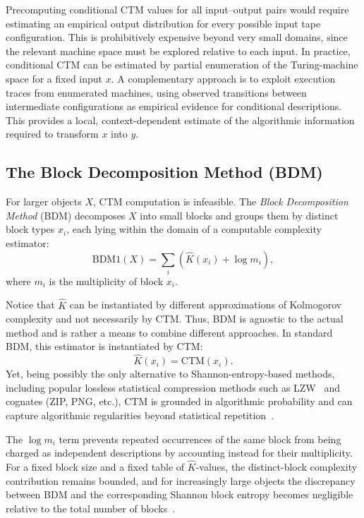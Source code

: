 \documentclass{article}
\begin{document}
Precomputing conditional CTM values for all input--output pairs would require estimating an empirical output distribution for every possible input tape configuration. This is prohibitively expensive beyond very small domains, since the relevant machine space must be explored relative to each input. In practice, conditional CTM can be estimated by partial enumeration of the Turing-machine space for a fixed input \(x\). A complementary approach is to exploit execution traces from enumerated machines, using observed transitions between intermediate configurations as empirical evidence for conditional descriptions. This provides a local, context-dependent estimate of the algorithmic information required to transform \(x\) into \(y\).


\subsection{The Block Decomposition Method (BDM)}

For larger objects \(X\), CTM computation is infeasible.
The \emph{Block Decomposition Method} (BDM) decomposes \(X\) into small blocks and groups them by distinct block types \(x_i\), each lying within the domain of a computable complexity estimator:
\[
\mathrm{BDM1}(X) = \sum_{i} \left( \hat K(x_i) + \log m_i \right),
\]
where $m_i$ is the multiplicity of block $x_i$.

Notice that $\hat K$ can be instantiated by different approximations of Kolmogorov complexity and not necessarily by CTM. Thus, BDM is agnostic to the actual method and is rather a means to combine different approaches. In standard BDM, this estimator is instantiated by CTM:
\[
\hat K(x_i) = \mathrm{CTM}(x_i).
\]
Yet, being possibly the only alternative to Shannon-entropy-based methods, including popular lossless statistical compression methods such as LZW~\cite{ziv_universal_1977, welch_technique_1984} and cognates (ZIP, PNG, etc.), CTM is grounded in algorithmic probability and can capture algorithmic regularities beyond statistical repetition~\cite{zenil_review_2020}.

The \(\log m_i\) term prevents repeated occurrences of the same block from being charged as independent descriptions by accounting instead for their multiplicity. For a fixed block size and a fixed table of \(\hat K\)-values, the distinct-block complexity contribution remains bounded, and for increasingly large objects the discrepancy between BDM and the corresponding Shannon block entropy becomes negligible relative to the total number of blocks~\cite{zenil_decomposition_2018}.
\end{document}
